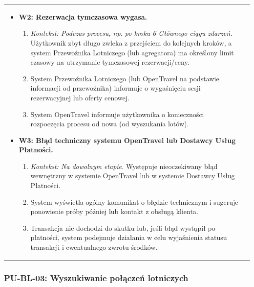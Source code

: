 \documentclass[a4paper,12pt]{article}
\begin{document}
\begin{longtable}{|p{\pierwszakolumnaszerokoscPUBLZakRes}|p{\drugakolumnaszerokoscPUBLZakRes}|}
\begin{itemize}
\begin{enumerate}
                \end{enumerate}
            \item \textbf{W2: Rezerwacja tymczasowa wygasa.}
                \begin{enumerate} \itemsep0pt \parskip0pt \parsep0pt
                    \item \textit{Kontekst: Podczas procesu, np. po kroku 6 Głównego ciągu zdarzeń.} Użytkownik zbyt długo zwleka z przejściem do kolejnych kroków, a system Przewoźnika Lotniczego (lub agregatora) ma określony limit czasowy na utrzymanie tymczasowej rezerwacji/ceny.
                    \item System Przewoźnika Lotniczego (lub OpenTravel na podstawie informacji od przewoźnika) informuje o wygaśnięciu sesji rezerwacyjnej lub oferty cenowej.
                    \item System OpenTravel informuje użytkownika o konieczności rozpoczęcia procesu od nowa (od wyszukania lotów).
                \end{enumerate}
            \item \textbf{W3: Błąd techniczny systemu OpenTravel lub Dostawcy Usług Płatności.}
                \begin{enumerate} \itemsep0pt \parskip0pt \parsep0pt
                    \item \textit{Kontekst: Na dowolnym etapie.} Występuje nieoczekiwany błąd wewnętrzny w systemie OpenTravel lub w systemie Dostawcy Usług Płatności.
                    \item System wyświetla ogólny komunikat o błędzie technicznym i sugeruje ponowienie próby później lub kontakt z obsługą klienta.
                    \item Transakcja nie dochodzi do skutku lub, jeśli błąd wystąpił po płatności, system podejmuje działania w celu wyjaśnienia statusu transakcji i ewentualnego zwrotu środków.
                \end{enumerate}
        \end{itemize} \\
\end{longtable}
\endgroup

\subsubsection{PU-BL-03: Wyszukiwanie połączeń lotniczych}

\begingroup %
\small %
\renewcommand{\arraystretch}{1.2} %
\end{document}
